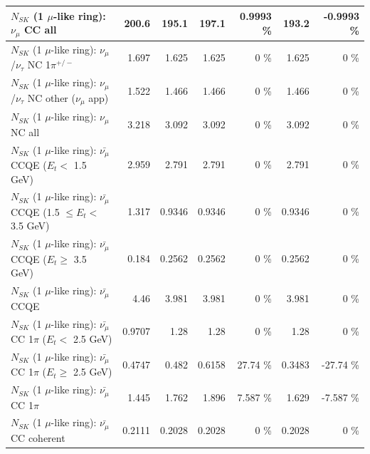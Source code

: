 \begin{table}
\begin{tabular}{| l | r | r | r  r | r  r |}
                                $N_{SK}$ (1 $\mu$-like ring): $\nu_{\mu}$ CC all &           200.6 &           195.1 &           197.1 &   0.9993 \%  &           193.2 &  -0.9993 \%  \\ 
\hline
              $N_{SK}$ (1 $\mu$-like ring): $\nu_\mu$/$\nu_\tau$ NC 1$\pi^{+/-}$ &           1.697 &           1.625 &           1.625 &        0 \%  &           1.625 &        0 \%  \\ 
     $N_{SK}$ (1 $\mu$-like ring): $\nu_\mu$/$\nu_\tau$ NC other ($\nu_\mu$ app) &           1.522 &           1.466 &           1.466 &        0 \%  &           1.466 &        0 \%  \\ 
                                $N_{SK}$ (1 $\mu$-like ring): $\nu_{\mu}$ NC all &           3.218 &           3.092 &           3.092 &        0 \%  &           3.092 &        0 \%  \\ 
\hline
\hline
\hline
          $N_{SK}$ (1 $\mu$-like ring): $\bar{\nu_\mu}$ CCQE ($E_{t} <$ 1.5 GeV) &           2.959 &           2.791 &           2.791 &        0 \%  &           2.791 &        0 \%  \\ 
 $N_{SK}$ (1 $\mu$-like ring): $\bar{\nu_\mu}$ CCQE (1.5 $\leq E_{t} <$ 3.5 GeV) &           1.317 &          0.9346 &          0.9346 &        0 \%  &          0.9346 &        0 \%  \\ 
       $N_{SK}$ (1 $\mu$-like ring): $\bar{\nu_\mu}$ CCQE ($E_{t} \geq$ 3.5 GeV) &           0.184 &          0.2562 &          0.2562 &        0 \%  &          0.2562 &        0 \%  \\ 
\hline
                              $N_{SK}$ (1 $\mu$-like ring): $\bar{\nu_\mu}$ CCQE &            4.46 &           3.981 &           3.981 &        0 \%  &           3.981 &        0 \%  \\ 
\hline
     $N_{SK}$ (1 $\mu$-like ring): $\bar{\nu_\mu}$ CC 1$\pi$ ($E_{t} <$ 2.5 GeV) &          0.9707 &            1.28 &            1.28 &        0 \%  &            1.28 &        0 \%  \\ 
  $N_{SK}$ (1 $\mu$-like ring): $\bar{\nu_\mu}$ CC 1$\pi$ ($E_{t} \geq$ 2.5 GeV) &          0.4747 &           0.482 &          0.6158 &    27.74 \%  &          0.3483 &   -27.74 \%  \\ 
\hline
                         $N_{SK}$ (1 $\mu$-like ring): $\bar{\nu_\mu}$ CC 1$\pi$ &           1.445 &           1.762 &           1.896 &    7.587 \%  &           1.629 &   -7.587 \%  \\ 
                       $N_{SK}$ (1 $\mu$-like ring): $\bar{\nu_\mu}$ CC coherent &          0.2111 &          0.2028 &          0.2028 &        0 \%  &          0.2028 &        0 \%  \\ 

\end{tabular}
\end{table}
